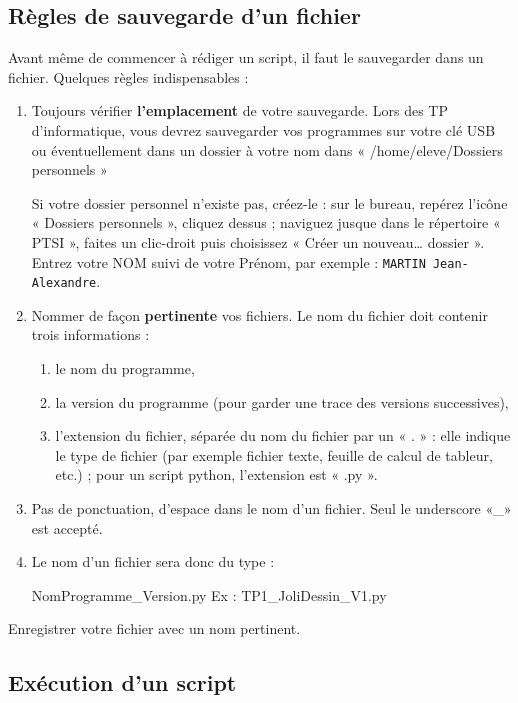 \subsection{R\` egles de sauvegarde d'un fichier}
Avant m\^ eme de commencer \` a r\' ediger un script, il faut le sauvegarder dans un fichier. Quelques r\` egles indispensables :
\begin{enumerate}
\item Toujours v\' erifier \textbf{l'emplacement} de votre sauvegarde. Lors des TP d'informatique, vous devrez sauvegarder vos programmes sur votre clé USB ou \' eventuellement dans un dossier à votre nom dans « /home/eleve/Dossiers personnels » 

Si votre dossier personnel n'existe pas, créez-le : sur le bureau, repérez l'icône « Dossiers personnels », cliquez dessus ; naviguez jusque dans le répertoire « PTSI », faites un clic-droit puis choisissez « Créer un nouveau{\dots} dossier ». Entrez votre NOM suivi de votre Prénom, par exemple : \texttt{MARTIN Jean-Alexandre}. 

\item Nommer de fa\c  con \textbf{pertinente} vos fichiers. Le nom du fichier doit contenir trois informations :
\begin{enumerate}
\item le nom du programme,
\item la version du programme (pour garder une trace des versions successives),
\item l'extension du fichier, séparée du nom du fichier par un « . » : elle indique le type de fichier (par exemple fichier texte, feuille de calcul de tableur, etc.) ; pour un script python, l'extension est « .py ».
\end{enumerate}
\item Pas de ponctuation, d'espace dans le nom d'un fichier. Seul le underscore «\_»   est accept\' e.
\item Le nom d'un fichier sera donc du type :
\begin{center}
NomProgramme\_Version.py\hspace{2cm} Ex : TP1\_JoliDessin\_V1.py
\end{center}
\end{enumerate}

Enregistrer votre fichier avec un nom pertinent.

\subsection{Ex\' ecution d'un script}

